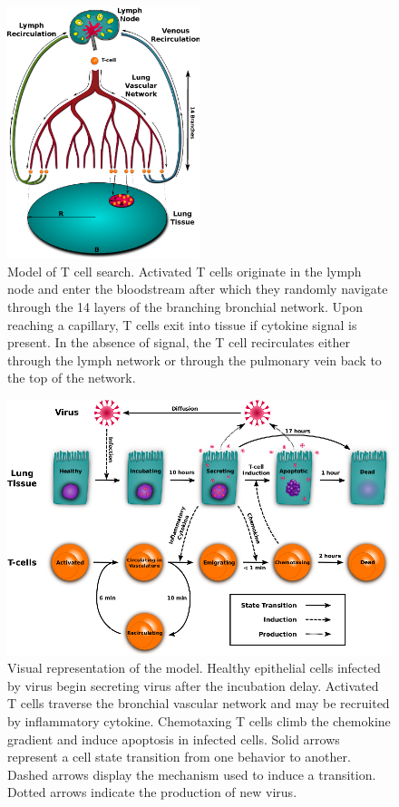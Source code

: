 \documentclass[10pt]{article}
\begin{document}
\begin{figure}[ht!]
\begin{center}
\includegraphics[width=0.5\textwidth]{SystemChart}
\end{center}
\caption{Model of T cell search.  Activated T cells originate in the lymph node and enter the bloodstream after which they randomly navigate through the 14 layers of the branching bronchial network.  Upon reaching a capillary, T cells exit into tissue if cytokine signal is present.  In the absence of signal, the T cell recirculates either through the lymph network or through the pulmonary vein back to the top of the network.}
\label{fig:systemchart}
\end{figure}

\begin{figure}[ht!]
\begin{center}
\includegraphics[width=\textwidth]{ModelChart}
\end{center}
\caption{Visual representation of the model.  Healthy epithelial cells infected by virus begin secreting virus after the incubation delay.  Activated T cells traverse the bronchial vascular network and may be recruited by inflammatory cytokine.  Chemotaxing T cells climb the chemokine gradient and induce apoptosis in infected cells.  Solid arrows represent a cell state transition from one behavior to another.  Dashed arrows display the mechanism used to induce a transition.  Dotted arrows indicate the production of new virus.}
\label{fig:modelchart}
\end{figure}
\end{document}
